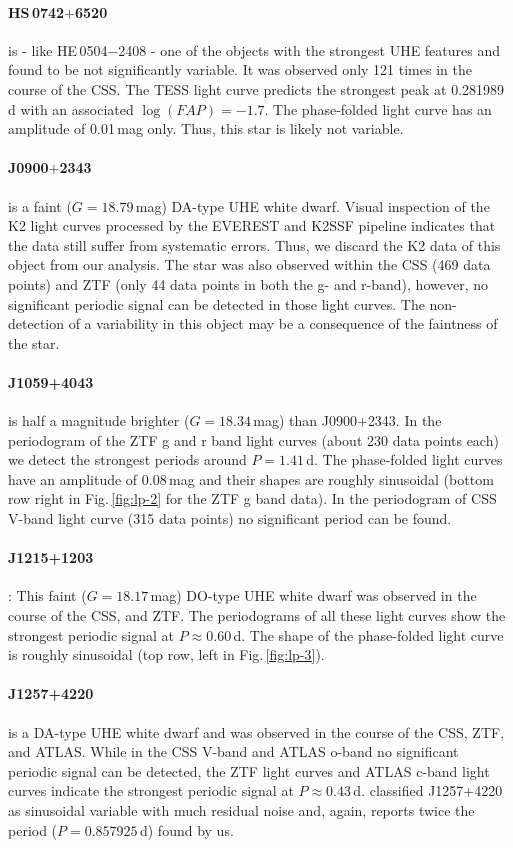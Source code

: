 \documentclass{aa}
\newcommand{\fg}[1]{\mbox{Fig.\,\ref{#1}}}
\begin{document}
\paragraph{HS\,0742$+$6520} is - like HE\,0504$-$2408 - one of the objects with
the strongest UHE features and found to be not significantly variable. It was
observed only 121 times in the course of the CSS. The TESS light curve predicts
the strongest peak at 0.281989\,d with an associated $\log(FAP)=-1.7$. The
phase-folded light curve has an amplitude of 0.01\,mag only. Thus, this star
is likely not variable.
\paragraph{J0900$+$2343}
is a faint ($G=18.79$\,mag) DA-type UHE white dwarf.
Visual inspection of the K2 light curves processed by the EVEREST and K2SSF
pipeline indicates that the data still suffer from systematic errors. Thus,
we discard the K2 data of this object from our analysis. The star was also
observed within the CSS (469 data points) and ZTF (only 44 data points in both
the g- and r-band), however, no significant periodic signal can be detected
in those light curves. The non-detection of a variability in this object may
be a consequence of the faintness of the star.
\paragraph{J1059+4043} is half a magnitude brighter ($G=18.34$\,mag) than
J0900$+$2343. In the periodogram of the ZTF g and r  band light curves (about 230
data points each) we detect the strongest periods around $P=1.41$\,d. The
phase-folded light curves have an amplitude of 0.08\,mag and their shapes
are roughly sinusoidal (bottom row right in \fg{fig:lp-2} for the ZTF g band
data). In the periodogram of CSS V-band light curve (315 data points) no
significant period can be found.
\paragraph{J1215+1203}: This faint ($G=18.17$\,mag) DO-type UHE white dwarf
was observed in the course of the CSS, and ZTF. The periodograms of all
these light curves show the strongest periodic signal at $P\approx0.60$\,d.
The shape of the phase-folded light curve is roughly sinusoidal (top
row, left in \fg{fig:lp-3}).
\paragraph{J1257+4220} is a DA-type UHE white dwarf and was observed in the course
of the CSS, ZTF, and ATLAS. While in the CSS V-band and ATLAS o-band
no significant periodic signal can be detected, the ZTF light curves and
ATLAS c-band light curves indicate the strongest periodic
signal at $P\approx0.43$\,d.
\cite{Heinze+2018} classified J1257+4220 as sinusoidal variable with much
residual noise and, again, reports twice the period ($P=0.857925$\,d)
found by us.
\end{document}
